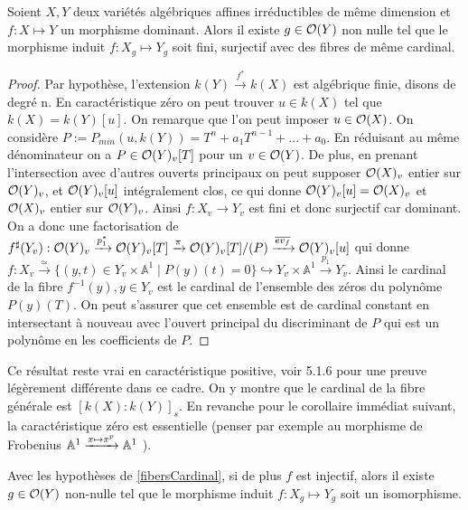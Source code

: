 \begin{prop}\label{fibersCardinal}
Soient $X,Y$ deux variétés algébriques affines irréductibles de même dimension et $f:X \mapsto Y$ un morphisme dominant. Alors il existe $g\in \mathcal{O}(Y)$ non nulle tel que le morphisme induit $f:X_g \mapsto Y_g$ soit fini, surjectif avec des fibres de même cardinal.
\end{prop}
\begin{proof}
Par hypothèse, l'extension $k(Y) \xrightarrow{f^*} k(X)$ est algébrique finie, disons de degré n. En caractéristique zéro on peut trouver $u\in k(X)$ tel que $k(X)=k(Y)[u]$. On remarque que l'on peut imposer $u\in \mathcal{O}(X)$. On considère $P:=P_{min}(u, k(Y))=T^n+a_1T^{n-1}+...+a_0$. En réduisant au même dénominateur on a $P\in \mathcal{O}(Y)_v[T]$ pour un $v\in \mathcal{O}(Y)$. De plus, en prenant l'intersection avec d'autres ouverts principaux on peut supposer $\mathcal{O}(X)_v$ entier sur $\mathcal{O}(Y)_v$, et $\mathcal{O}(Y)_v[u]$ intégralement clos, ce qui donne $\mathcal{O}(Y)_v[u]=\mathcal{O}(X)_v$ et $\mathcal{O}(X)_v$ entier sur $\mathcal{O}(Y)_v$. Ainsi $f:X_v \rightarrow Y_v$ est fini et donc surjectif car dominant.\\
On a donc une factorisation de $f^\sharp(Y_v):\mathcal{O}(Y)_v\xrightarrow{p_1^*}\mathcal{O}(Y)_v[T]\xrightarrow{\pi}\mathcal{O}(Y)_v[T]/(P)\xrightarrow{\overline{ev_f}}\mathcal{O}(Y)_v[u]$ qui donne $f:X_v \xrightarrow{\simeq} \lbrace (y,t) \in Y_v\times \mathbb{A}^1\mid P(y)(t)=0\rbrace \hookrightarrow Y_v\times \mathbb{A}^1 \xrightarrow{p_1} Y_v$. Ainsi le cardinal de la fibre $f^{-1}(y), y\in Y_v$ est le cardinal de l'ensemble des zéros du polynôme $P(y)(T)$. On peut s'assurer que cet ensemble est de cardinal constant en intersectant à nouveau avec l'ouvert principal du discriminant de $P$ qui est un polynôme en les coefficients de $P$.
\end{proof}

Ce résultat reste vrai en caractéristique positive, voir \cite{LAGSpringer} 5.1.6 pour une preuve légèrement différente dans ce cadre. On y montre que le cardinal de la fibre générale est $[k(X):k(Y)]_s$. En revanche pour le corollaire immédiat suivant, la caractéristique zéro est essentielle (penser par exemple au morphisme de Frobenius $\mathbb{A}^1 \xrightarrow{x \mapsto x^p} \mathbb{A}^1$ ). 

\begin{cor}\label{injectiveBirationel}
Avec les hypothèses de \ref{fibersCardinal}, si de plus $f$ est injectif, alors il existe $g\in \mathcal{O}(Y)$ non-nulle tel que le morphisme induit $f:X_g \mapsto Y_g$ soit un isomorphisme.
\end{cor}

